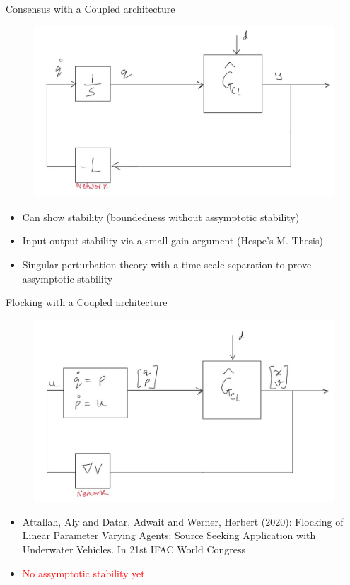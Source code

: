 \documentclass{beamer}
\begin{document}
\begin{frame}{Consensus with a Coupled architecture}
\begin{figure}
	\includegraphics[height=0.45\textheight]{figures/cons_coupled.jpg}
\end{figure}
\begin{itemize}
	\item Can show stability (boundedness without assymptotic stability)
	\item Input output stability via a small-gain argument (Hespe's M. Thesis)
	\item Singular perturbation theory with a time-scale separation to prove assymptotic stability
\end{itemize}
\end{frame}
\begin{frame}{Flocking with a Coupled architecture}
	
\begin{figure}
	\includegraphics[height=0.45\textheight]{figures/Flocking_coupled.jpg}
\end{figure}
\begin{itemize}
	\item Attallah, Aly and Datar, Adwait and Werner, Herbert (2020): Flocking of Linear Parameter Varying Agents: Source Seeking Application with Underwater Vehicles. In 21st IFAC World Congress
	\item \textcolor{red}{No assymptotic stability yet}
\end{itemize}
\end{frame}
\end{document}
